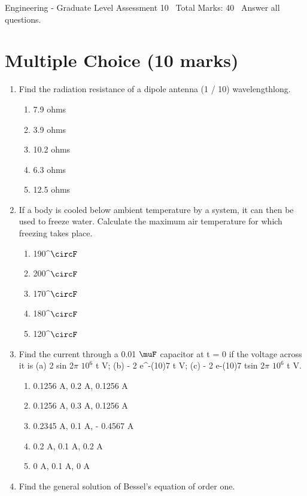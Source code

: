 \documentclass[12pt]{article}
\begin{document}
\begin{center}
Engineering - Graduate Level Assessment 10 \
Total Marks: 40 \
Answer all questions.
\end{center}

\section*{Multiple Choice (10 marks)}
\begin{enumerate}[label=\arabic*.]
\item Find the radiation resistance of a dipole antenna (1 / 10) wavelengthlong.
\begin{enumerate}[label=(\alph*)]
    \item 7.9 ohms
    \item 3.9 ohms
    \item 10.2 ohms
    \item 6.3 ohms
    \item 12.5 ohms
\end{enumerate}
\item If a body is cooled below ambient temperature by a system, it can then be used to freeze water. Calculate the maximum air temperature for which freezing takes place.
\begin{enumerate}[label=(\alph*)]
    \item 190^\ensuremath{\circF}
    \item 200^\ensuremath{\circF}
    \item 170^\ensuremath{\circF}
    \item 180^\ensuremath{\circF}
    \item 120^\ensuremath{\circF}
\end{enumerate}
\item Find the current through a 0.01 \ensuremath{\muF} capacitor at t = 0 if the voltage across it is (a) 2 sin 2\ensuremath{\pi} $10^6$ t V; (b) - 2 e^-(10)7 t V; (c) - 2 e-(10)7 tsin 2\ensuremath{\pi} $10^6$ t V.
\begin{enumerate}[label=(\alph*)]
    \item 0.1256 A, 0.2 A, 0.1256 A
    \item 0.1256 A, 0.3 A, 0.1256 A
    \item 0.2345 A, 0.1 A, - 0.4567 A
    \item 0.2 A, 0.1 A, 0.2 A
    \item 0 A, 0.1 A, 0 A
\end{enumerate}
\item Find the general solution of Bessel's equation of order one.

\end{enumerate}
\end{document}
